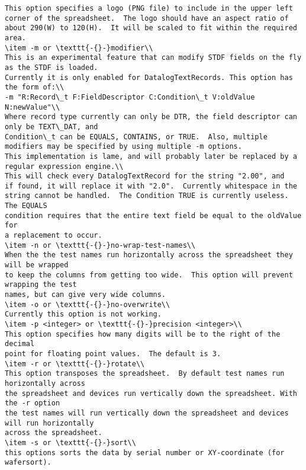\documentclass[letterpaper]{article}
\begin{document}
\begin{verbatim}
This option specifies a logo (PNG file) to include in the upper left
corner of the spreadsheet.  The logo should have an aspect ratio of
about 290(W) to 120(H).  It will be scaled to fit within the required area.
\item -m or \texttt{-{}-}modifier\\
This is an experimental feature that can modify STDF fields on the fly as the STDF is loaded.
Currently it is only enabled for DatalogTextRecords. This option has the form of:\\
-m "R:Record\_t F:FieldDescriptor C:Condition\_t V:oldValue N:newValue"\\
Where record type currently can only be DTR, the field descriptor can only be TEXT\_DAT, and
Condition\_t can be EQUALS, CONTAINS, or TRUE.  Also, multiple modifiers may be specified by using multiple -m options.
This implementation is lame, and will probably later be replaced by a regular expression engine.\\
This will check every DatalogTextRecord for the string "2.00", and
if found, it will replace it with "2.0".  Currently whitespace in the
string cannot be handled.  The Condition TRUE is currently useless. The EQUALS
condition requires that the entire text field be equal to the oldValue for
a replacement to occur.
\item -n or \texttt{-{}-}no-wrap-test-names\\
When the the test names run horizontally across the spreadsheet they will be wrapped
to keep the columns from getting too wide.  This option will prevent wrapping the test
names, but can give very wide columns.
\item -o or \texttt{-{}-}no-overwrite\\
Currently this option is not working.
\item -p <integer> or \texttt{-{}-}precision <integer>\\
This option specifies how many digits will be to the right of the decimal
point for floating point values.  The default is 3.
\item -r or \texttt{-{}-}rotate\\
This option transposes the spreadsheet.  By default test names run horizontally across
the spreadsheet and devices run vertically down the spreadsheet. With the -r option
the test names will run vertically down the spreadsheet and devices will run horizontally
across the spreadsheet.
\item -s or \texttt{-{}-}sort\\
this options sorts the data by serial number or XY-coordinate (for wafersort).

\end{verbatim}
\end{document}
